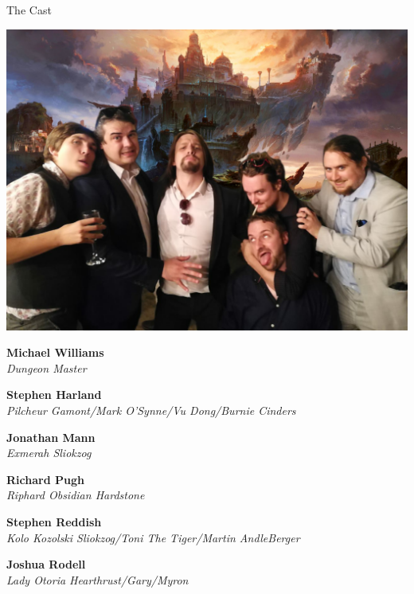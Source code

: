 \onecolumn
\clearpage

\begin{center}
 
\vspace*{10mm} 
 
\Huge
The Cast
\vspace{10mm}

\begin{center}
\includegraphics[width=140mm]{./content/img/teamPhoto.png}
\begin{figure}[h]
\end{figure}
\end{center}



\huge

\textbf{Michael Williams} \\
\textit{Dungeon Master}
\vspace{5mm}

\large

\textbf{Stephen Harland} \\
\textit{Pilcheur Gamont/Mark O'Synne/Vu Dong/Burnie Cinders} \\

\vspace{5mm}

\textbf{Jonathan Mann} \\
\textit{Exmerah Sliokzog}\\

\vspace{5mm}

\textbf{Richard Pugh} \\
\textit{Riphard Obsidian Hardstone}\\

\vspace{5mm}

\textbf{Stephen Reddish} \\
\textit{Kolo Kozolski Sliokzog/Toni The Tiger/Martin AndleBerger}\\

\vspace{5mm}

\textbf{Joshua Rodell} \\
\textit{Lady Otoria Hearthrust/Gary/Myron}  \\

\vspace{5mm}

\end{center}

\clearpage